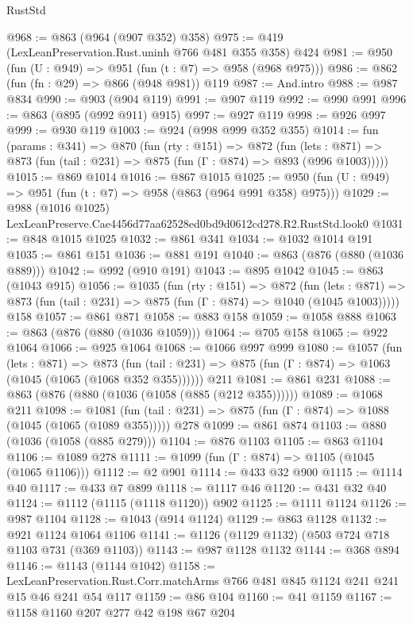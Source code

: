 \begin{lexlean}{RustStd}
\begin{coremodule}
@968 := @863 (@964 (@907 @352) @358)
@975 := @419 (LexLeanPreservation.Rust.uninh @766 @481 @355 @358) @424
@981 := @950 (fun (U : @949) => @951 (fun (t : @7) => @958 (@968 @975)))
@986 := @862 (fun (fn : @29) => @866 (@948 @981)) @119
@987 := And.intro
@988 := @987 @834
@990 := @903 (@904 @119)
@991 := @907 @119
@992 := @990 @991
@996 := @863 (@895 (@992 @911) @915)
@997 := @927 @119
@998 := @926 @997
@999 := @930 @119
@1003 := @924 (@998 @999 @352 @355)
@1014 := fun (params : @341) =>
  @870
    (fun (rty : @151) =>
    @872
      (fun (lets : @871) => @873 (fun (tail : @231) => @875 (fun (Γ : @874) => @893 (@996 @1003)))))
@1015 := @869 @1014
@1016 := @867 @1015
@1025 := @950 (fun (U : @949) => @951 (fun (t : @7) => @958 (@863 (@964 @991 @358) @975)))
@1029 := @988 (@1016 @1025) LexLeanPreserve.Cae4456d77aa62528ed0bd9d0612cd278.R2.RustStd.look0
@1031 := @848 @1015 @1025
@1032 := @861 @341
@1034 := @1032 @1014 @191
@1035 := @861 @151
@1036 := @881 @191
@1040 := @863 (@876 (@880 (@1036 @889)))
@1042 := @992 (@910 @191)
@1043 := @895 @1042
@1045 := @863 (@1043 @915)
@1056 := @1035
    (fun (rty : @151) =>
    @872
      (fun (lets : @871) =>
      @873 (fun (tail : @231) => @875 (fun (Γ : @874) => @1040 (@1045 @1003)))))
    @158
@1057 := @861 @871
@1058 := @883 @158
@1059 := @1058 @888
@1063 := @863 (@876 (@880 (@1036 @1059)))
@1064 := @705 @158
@1065 := @922 @1064
@1066 := @925 @1064
@1068 := @1066 @997 @999
@1080 := @1057
    (fun (lets : @871) =>
    @873 (fun (tail : @231) => @875 (fun (Γ : @874) => @1063 (@1045 (@1065 (@1068 @352 @355))))))
    @211
@1081 := @861 @231
@1088 := @863 (@876 (@880 (@1036 (@1058 (@885 (@212 @355))))))
@1089 := @1068 @211
@1098 := @1081
    (fun (tail : @231) => @875 (fun (Γ : @874) => @1088 (@1045 (@1065 (@1089 @355)))))
    @278
@1099 := @861 @874
@1103 := @880 (@1036 (@1058 (@885 @279)))
@1104 := @876 @1103
@1105 := @863 @1104
@1106 := @1089 @278
@1111 := @1099 (fun (Γ : @874) => @1105 (@1045 (@1065 @1106)))
@1112 := @2 @901
@1114 := @433 @32 @900
@1115 := @1114 @40
@1117 := @433 @7 @899
@1118 := @1117 @46
@1120 := @431 @32 @40
@1124 := @1112 (@1115 (@1118 @1120)) @902
@1125 := @1111 @1124
@1126 := @987 @1104
@1128 := @1043 (@914 @1124)
@1129 := @863 @1128
@1132 := @921 @1124 @1064 @1106
@1141 := @1126 (@1129 @1132) (@503 @724 @718 @1103 @731 (@369 @1103))
@1143 := @987 @1128 @1132
@1144 := @368 @894
@1146 := @1143 (@1144 @1042)
@1158 := LexLeanPreservation.Rust.Corr.matchArms
    @766
    @481
    @845
    @1124
    @241
    @241
    @15
    @46
    @241
    @54
    @117
@1159 := @86 @104
@1160 := @41 @1159
@1167 := @1158 @1160 @207 @277 @42 @198 @67 @204

\end{coremodule}
\end{lexlean}
